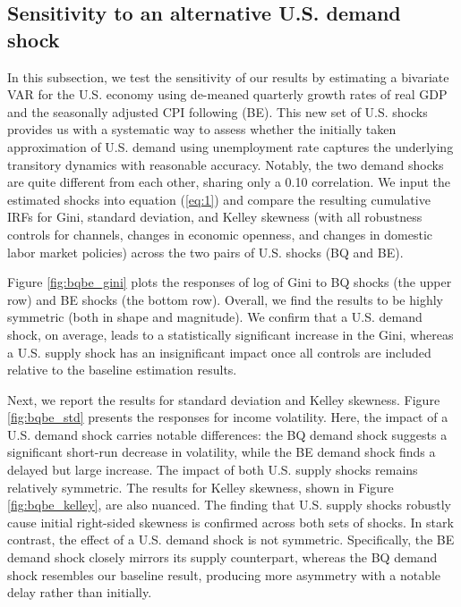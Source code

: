 \documentclass[12pt, a4paper]{article}
\begin{document}
\subsection{Sensitivity to an alternative U.S. demand shock}
\label{section:sensitivity}
In this subsection, we test the sensitivity of our results by estimating a bivariate VAR for the U.S. economy using de-meaned quarterly growth rates of real GDP and the seasonally adjusted CPI following \textcite{bayoumi1992shocking} (BE). This new set of U.S. shocks provides us with a systematic way to assess whether the initially taken approximation of U.S. demand using unemployment rate captures the underlying transitory dynamics with reasonable accuracy. Notably, the two demand shocks are quite different from each other, sharing only a 0.10 correlation. We input the estimated shocks into equation (\ref{eq:1}) and compare the resulting cumulative IRFs for Gini, standard deviation, and Kelley skewness (with all robustness controls for channels, changes in economic openness, and changes in domestic labor market policies) across the two pairs of U.S. shocks (BQ and BE).

Figure \ref{fig:bqbe_gini} plots the responses of log of Gini to BQ shocks (the upper row) and BE shocks (the bottom row). Overall, we find the results to be highly symmetric (both in shape and magnitude). We confirm that a U.S. demand shock, on average, leads to a statistically significant increase in the Gini, whereas a U.S. supply shock has an insignificant impact once all controls are included relative to the baseline estimation results.

Next, we report the results for standard deviation and Kelley skewness. Figure \ref{fig:bqbe_std} presents the responses for income volatility. Here, the impact of a U.S. demand shock carries notable differences: the BQ demand shock suggests a significant short-run decrease in volatility, while the BE demand shock finds a delayed but large increase. The impact of both U.S. supply shocks remains relatively symmetric. The results for Kelley skewness, shown in Figure \ref{fig:bqbe_kelley}, are also nuanced. The finding that U.S. supply shocks robustly cause initial right-sided skewness is confirmed across both sets of shocks. In stark contrast, the effect of a U.S. demand shock is not symmetric. Specifically, the BE demand shock closely mirrors its supply counterpart, whereas the BQ demand shock resembles our baseline result, producing more asymmetry with a notable delay rather than initially. 
\end{document}
